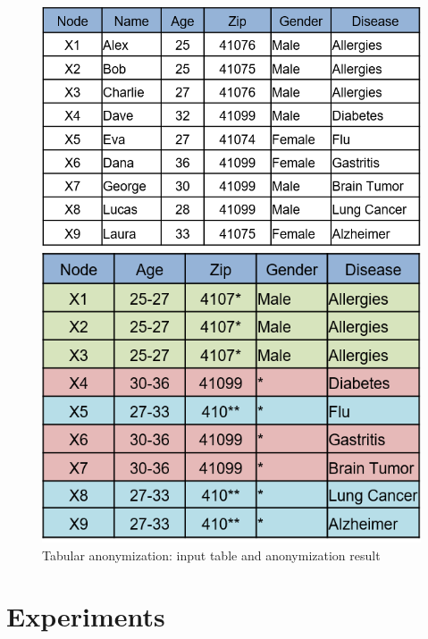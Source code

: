 \documentclass{llncs}
\begin{document}
\begin{figure}[!t]
	\centering
	\begin{minipage}[b]{0.535\textwidth}
		\includegraphics[width=\textwidth]{figures/anonym/k_anon_input}
	\end{minipage}
	\hfill
	\begin{minipage}[b]{0.448\textwidth}
		\includegraphics[width=\textwidth]{figures/anonym/k_anon_output}
	\end{minipage}
	\caption{Tabular anonymization: input table and anonymization result}
	\label{fig:anonymized_clusters}
\end{figure}



\section{Experiments}
\label{sect:experiments}
\end{document}
